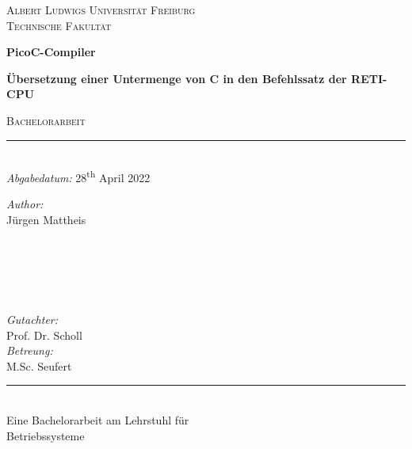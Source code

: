 
\begin{titlepage}
  \vspace{1cm}
  \center
  \textsc{\LARGE Albert Ludwigs Universität Freiburg}\\[0.5cm]
  \textsc{\Large Technische Fakultät}\\[2.0cm]

  \vspace{1cm}

  \begin{titlebox}{\center \huge \bfseries PicoC-Compiler}
    \center
    {\bfseries \center \LARGE {} Übersetzung einer Untermenge von C in den Befehlssatz der RETI-CPU\par}
  \end{titlebox}
    \textsc{\large Bachelorarbeit}\\
    \rule{\linewidth}{0.1mm}\\[0.5cm]

  {\large \emph{Abgabedatum:} 28\textsuperscript{th} April 2022}\\[2.5cm]

  \begin{minipage}{0.45\textwidth}
    \begin{flushleft} \large
      \emph{Author:}\\
      Jürgen Mattheis\\
      \hspace{1cm}\\
      \hspace{1cm}\\
      \hspace{1cm}\\
      \hspace{1cm}
    \end{flushleft}
  \end{minipage}
  ~
  \begin{minipage}{0.45\textwidth}
    \begin{flushright} \large
      \emph{Gutachter:}\\
      Prof. Dr. Scholl\\[0.64cm]
      \emph{Betreung:}\\
      M.Sc. Seufert\\
    \end{flushright}
  \end{minipage}

  \vspace{8.cm}
  \rule{11cm}{0.1mm}\\[0.25cm]
  \large{Eine Bachelorarbeit am Lehrstuhl für}\\
  \large{Betriebssysteme}
\end{titlepage}
